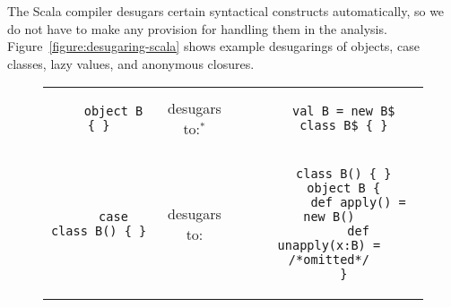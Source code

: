 \documentclass[letterpaper,11pt]{article}
\begin{document}
The Scala compiler desugars certain syntactical constructs automatically,
so we do not have to make any provision for handling them in the analysis.
Figure~\ref{figure:desugaring-scala} shows example desugarings of objects,
case classes, lazy values, and anonymous closures.

\begin{figure}[hbp]
\begin{center}
\begin{tabular}{ccc}


\begin{minipage}{0.3\textwidth}\begin{lstlisting}
	object B { }
\end{lstlisting}\end{minipage}
& desugars to:$^*$ &
\begin{minipage}{0.5\textwidth}\begin{lstlisting}
	val B = new B$
	class B$ { }
\end{lstlisting}\end{minipage}
\\

\begin{minipage}{0.3\textwidth}\begin{lstlisting}
	case class B() { }
\end{lstlisting}\end{minipage}
& desugars to: &
\begin{minipage}{0.5\textwidth}\begin{lstlisting}
	class B() { }
	object B {
		def apply() = new B()
		def unapply(x:B) = /*omitted*/
	}
\end{lstlisting}\end{minipage}
\\



\end{tabular}
\end{center}
\end{figure}
\end{document}
